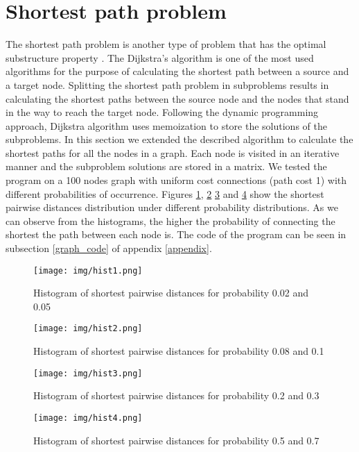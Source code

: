 \documentclass[runningheads]{llncs}
\begin{document}
\section{Shortest path problem}
The shortest path problem is another type of problem that has the
optimal substructure property \cite{dijkstra}. The Dijkstra's
algorithm is one of the most used algorithms for the purpose of
calculating the shortest path between a source and a target
node. Splitting the shortest path problem in subproblems results in
calculating the shortest paths between the source node and the nodes
that stand in the way to reach the target node. Following the dynamic
programming approach, Dijkstra algorithm uses memoization to store the
solutions of the subproblems. In this section we extended the
described algorithm to calculate the shortest paths for all the nodes
in a graph. Each node is visited in an iterative manner and the
subproblem solutions are stored in a matrix. We tested the program on
a 100 nodes graph with uniform cost connections (path cost 1) with
different probabilities of occurrence. Figures \ref{hist1},
\ref{hist2} \ref{hist3} and \ref{hist4} show the shortest pairwise
distances distribution under different probability distributions. As
we can observe from the histograms, the higher the probability of
connecting the shortest the path between each node is. 
The code of the program can be seen in subsection \ref{graph_code} of
appendix \ref{appendix}.
\begin{figure}
\texttt{[image: img/hist1.png]}
\caption{Histogram of shortest pairwise distances for probability 0.02
and 0.05} \label{hist1}
\end{figure}
\begin{figure}
\texttt{[image: img/hist2.png]}
\caption{Histogram of shortest pairwise distances for probability 0.08
and 0.1} \label{hist2}
\end{figure}
\begin{figure}
\texttt{[image: img/hist3.png]}
\caption{Histogram of shortest pairwise distances for probability 0.2
and 0.3} \label{hist3}
\end{figure}
\begin{figure}
\texttt{[image: img/hist4.png]}
\caption{Histogram of shortest pairwise distances for probability 0.5
and 0.7} \label{hist4}
\end{figure}
\end{document}
